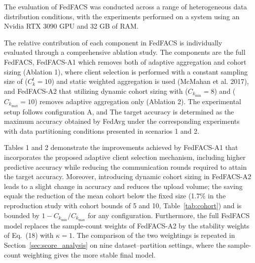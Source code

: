 \documentclass[pdflatex,sn-mathphys-num,oneside]{sn-jnl}%
\theoremstyle{thmstyleone}%
\theoremstyle{thmstyletwo}%
\theoremstyle{thmstylethree}%
\begin{document}
The evaluation of FedFACS was conducted across a range of heterogeneous data distribution conditions, with the experiments performed on a system using an Nvidia RTX 3090 GPU and 32 GB of RAM.

The relative contribution of each component in FedFACS is individually evaluated through a comprehensive ablation study. The components are the full FedFACS, FedFACS-A1 which removes both of adaptive aggregation and cohort sizing (Ablation 1), where client selection is performed with a constant sampling size of ($C_k^t=10$) and static weighted aggregation is used (McMahan et al. 2017), and FedFACS-A2 that utilizing dynamic cohort sizing with ($C_{k_{\min}} = 8$) and ($C_{k_{\max}} = 10$) removes adaptive aggregation only (Ablation 2). The experimental setup follows configuration A, and The target accuracy is determined as the maximum accuracy obtained by FedAvg under the corresponding experiments with data partitioning conditions presented in scenarios 1 and 2.

Tables 1 and 2 demonstrate the improvements achieved by FedFACS-A1 that incorporates the proposed adaptive client selection mechanism, including higher predictive accuracy while reducing the communication rounds required to attain the target accuracy. Moreover, introducing dynamic cohort sizing in FedFACS-A2 leads to a slight change in accuracy and reduces the upload volume; the saving equals the reduction of the mean cohort below the fixed size (1.7\% in the reproduction study with cohort bounds of 5 and 10, Table~\ref{tab:cohort}) and is bounded by $1-C_{k_{\min}}/C_{k_{\max}}$ for any configuration. Furthermore, the full FedFACS model replaces the sample-count weights of FedFACS-A2 by the stability weights of Eq.~(18) with $\kappa=1$. The comparison of the two weightings is repeated in Section~\ref{sec:score_analysis} on nine dataset--partition settings, where the sample-count weighting gives the more stable final model.

\FloatBarrier

\FloatBarrier
\end{document}
